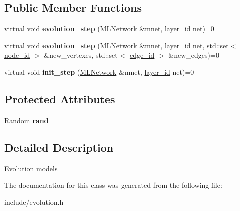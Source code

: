 \subsection*{Public Member Functions}
\begin{DoxyCompactItemize}
\item 
\hypertarget{classmlnet_1_1_evolution_model_ac4ee4d547e21c3ce4dbe0b721b69999d}{virtual void {\bfseries evolution\+\_\+step} (\hyperlink{classmlnet_1_1_m_l_network}{M\+L\+Network} \&mnet, \hyperlink{namespacemlnet_a84ad9c6056f0eb7d129995351f9b13fb}{layer\+\_\+id} net)=0}\label{classmlnet_1_1_evolution_model_ac4ee4d547e21c3ce4dbe0b721b69999d}

\item 
\hypertarget{classmlnet_1_1_evolution_model_a784021db951c97adbbf679b02d7466de}{virtual void {\bfseries evolution\+\_\+step} (\hyperlink{classmlnet_1_1_m_l_network}{M\+L\+Network} \&mnet, \hyperlink{namespacemlnet_a84ad9c6056f0eb7d129995351f9b13fb}{layer\+\_\+id} net, std\+::set$<$ \hyperlink{namespacemlnet_a4c354f08ca868982bf3ddae882ff71c6}{node\+\_\+id} $>$ \&new\+\_\+vertexes, std\+::set$<$ \hyperlink{namespacemlnet_ad708e58e72680351e102e6b3d0489145}{edge\+\_\+id} $>$ \&new\+\_\+edges)=0}\label{classmlnet_1_1_evolution_model_a784021db951c97adbbf679b02d7466de}

\item 
\hypertarget{classmlnet_1_1_evolution_model_a6ebe6005b628535025819d52eee12f02}{virtual void {\bfseries init\+\_\+step} (\hyperlink{classmlnet_1_1_m_l_network}{M\+L\+Network} \&mnet, \hyperlink{namespacemlnet_a84ad9c6056f0eb7d129995351f9b13fb}{layer\+\_\+id} net)=0}\label{classmlnet_1_1_evolution_model_a6ebe6005b628535025819d52eee12f02}

\end{DoxyCompactItemize}
\subsection*{Protected Attributes}
\begin{DoxyCompactItemize}
\item 
\hypertarget{classmlnet_1_1_evolution_model_a634df31faea6dfe62dd2c9d3ea150b22}{Random {\bfseries rand}}\label{classmlnet_1_1_evolution_model_a634df31faea6dfe62dd2c9d3ea150b22}

\end{DoxyCompactItemize}


\subsection{Detailed Description}
Evolution models 

The documentation for this class was generated from the following file\+:\begin{DoxyCompactItemize}
\item 
include/evolution.\+h\end{DoxyCompactItemize}
